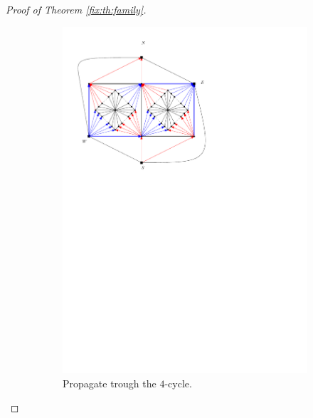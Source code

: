 \begin{proof}[Proof of Theorem \ref{fix:th:family}]
\begin{figure}[h]
\begin{subfigure}[t]{0.3\textwidth}
      \includegraphics[width=\textwidth]{fixExtension/img/manymany2}
      \caption{Propagate trough the $4$-cycle.}
      \label{fig:fix:manymany2}
    \end{subfigure}
    \quad
    \begin{subfigure}[t]{0.3\textwidth}

\end{subfigure}
\end{figure}
\end{proof}
